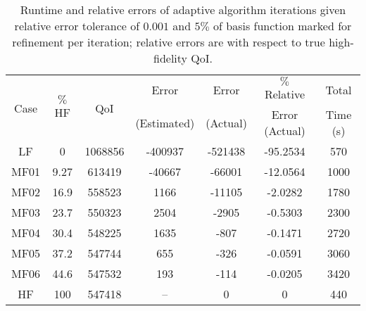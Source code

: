 %
\begin{table}
\caption{Runtime and relative errors of adaptive algorithm iterations given relative error tolerance of $0.001$ and $5\%$ of basis function marked for refinement per iteration; relative errors are with respect to true high-fidelity QoI.}
\label{tab:ref3D_dainty}
\centering
\begin{tabular}{|c|c|c|c|c|c|c|}
\hline
\multirow{2}{*}{Case} & \multirow{2}{*}{$\%$HF} & \multirow{2}{*}{QoI} & Error & Error & $\%$ Relative & Total \\ 
& & & (Estimated) & (Actual) & Error (Actual) & Time (s) \\ \hline
LF   & 0    & 1068856 & -400937 & -521438 & -95.2534 & 570 \\
MF01 & 9.27 & 613419  & -40667  & -66001  & -12.0564 & 1000 \\
MF02 & 16.9 & 558523  & 1166    & -11105  & -2.0282  & 1780 \\
MF03 & 23.7 & 550323  & 2504    & -2905   & -0.5303  & 2300 \\
MF04 & 30.4 & 548225  & 1635    & -807    & -0.1471  & 2720 \\
MF05 & 37.2 & 547744  & 655     & -326    & -0.0591  & 3060 \\
MF06 & 44.6 & 547532  & 193     & -114    & -0.0205  & 3420 \\ %
HF   & 100  & 547418  & --      & 0       & 0        & 440 \\ \hline
\end{tabular}
\end{table}
%
